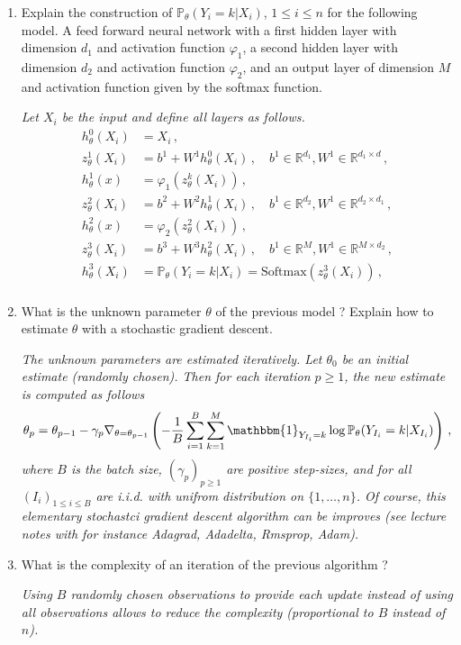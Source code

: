 \documentclass[a4paper,10pt,fleqn]{article}
\newcommand{\eqsp}{\,}
\newcommand{\1}{\ensuremath{\mathbbm{1}}}
\begin{document}
\begin{enumerate}
\item Explain the construction of $\mathbb{P}_{\theta}(Y_i = k | X_i)$, $1\leqslant i\leqslant n$ for the following model. A feed forward neural network with a first hidden layer with dimension $d_1$ and activation function $\varphi_1$,  a second hidden layer with dimension $d_2$ and activation function $\varphi_2$, and an output layer of dimension $M$ and activation function given by the softmax function.

\vspace{.2cm}

{\em
Let $X_i$ be the input and define all layers as follows.
\begin{align*}
h_{\theta}^0(X_i) &= X_i\eqsp,\\
z_{\theta}^1(X_i)  &= b^1 + W^1h_{\theta}^{0}(X_i)\eqsp, \quad b^1\in\mathbb{R}^{d_1}, W^1 \in\mathbb{R}^{d_1\times d}\eqsp,\\
h_{\theta}^1(x)  &= \varphi_1(z_{\theta}^{k}(X_i))\eqsp,\\
z_{\theta}^2(X_i)  &= b^2 + W^2h_{\theta}^{1}(X_i)\eqsp,\quad b^1\in\mathbb{R}^{d_2}, W^1 \in\mathbb{R}^{d_2\times d_1}\eqsp,\\
h_{\theta}^2(x)  &= \varphi_2(z_{\theta}^{2}(X_i))\eqsp,\\
z_{\theta}^3(X_i)  &= b^3 + W^3h_{\theta}^{2}(X_i)\eqsp,\quad b^1\in\mathbb{R}^{M}, W^1 \in\mathbb{R}^{M\times d_2}\eqsp,\\
h_{\theta}^3(X_i)  &= \mathbb{P}_{\theta}(Y_i = k | X_i) = \mathrm{Softmax}(z_{\theta}^{3}(X_i))\eqsp,\\
\end{align*}
}
\item What is the unknown parameter $\theta$ of the previous model ? Explain how to estimate $\theta$ with  a stochastic gradient descent.

\vspace{.2cm}

{\em
The unknown parameters are estimated iteratively. Let $\theta_0$ be an initial estimate (randomly chosen). Then for each iteration $p\geqslant 1$, the new estimate is computed as follows
$$
\theta_p = \theta_{p-1} - \gamma_p \nabla_{\theta=\theta_{p-1}} \left(-\frac{1}{B} \sum_{i=1}^B\sum_{k=1}^{M} \1_{Y_{I_i}=k}\log \mathbb{P}_{\theta}(Y_{I_i} = k | X_{I_i})\right)\eqsp,
$$
where $B$ is the batch size, $(\gamma_p)_{p\geqslant 1}$ are positive step-sizes, and for all $(I_i)_{1 \leqslant i \leqslant B}$ are i.i.d. with unifrom distribution on  $\{1,\ldots,n\}$. Of course, this elementary stochastci gradient descent algorithm can be improves (see lecture notes with for instance Adagrad, Adadelta, Rmsprop, Adam).
}
\item What is the complexity of an iteration of the previous algorithm ?

\vspace{.2cm}

{\em
Using $B$ randomly chosen observations to provide each update instead of using all observations allows to reduce the complexity (proportional to $B$ instead of $n$).
}
\end{enumerate}
\end{document}
